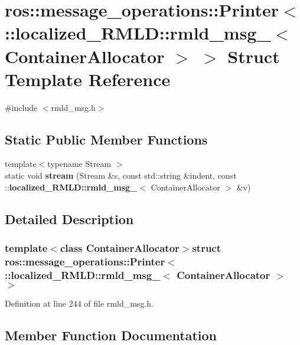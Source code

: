 \section{ros::message\_\-operations::Printer$<$ ::localized\_\-RMLD::rmld\_\-msg\_\-$<$ ContainerAllocator $>$ $>$ Struct Template Reference}
\label{structros_1_1message__operations_1_1Printer_3_01_1_1localized__RMLD_1_1rmld__msg___3_01ContainerAllocator_01_4_01_4}


{\ttfamily \#include $<$rmld\_\-msg.h$>$}

\subsection*{Static Public Member Functions}
\begin{DoxyCompactItemize}
\item 
{\footnotesize template$<$typename Stream $>$ }\\static void {\bf stream} (Stream \&s, const std::string \&indent, const ::{\bf localized\_\-RMLD::rmld\_\-msg\_\-}$<$ ContainerAllocator $>$ \&v)
\end{DoxyCompactItemize}


\subsection{Detailed Description}
\subsubsection*{template$<$class ContainerAllocator$>$struct ros::message\_\-operations::Printer$<$ ::localized\_\-RMLD::rmld\_\-msg\_\-$<$ ContainerAllocator $>$ $>$}



Definition at line 244 of file rmld\_\-msg.h.



\subsection{Member Function Documentation}
